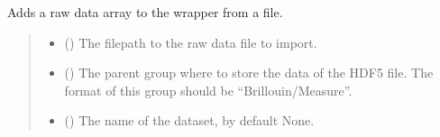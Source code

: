 \documentclass[letterpaper,10pt,english]{sphinxmanual}
\begin{document}
\begin{fulllineitems}
\begin{fulllineitems}
\begin{quote}
\begin{description}
\end{description}\end{quote}

\end{fulllineitems}


\begin{fulllineitems}
\label{\detokenize{source/_autosummary/HDF5_BLS.Wrapper:HDF5_BLS.Wrapper.import_other}}
\pysigstartsignatures
\pysiglinewithargsret
{}
{\sphinxparamcomma {}\sphinxparamcomma {}\sphinxparamcomma {}\sphinxparamcomma {}\sphinxparamcomma {}\sphinxparamcomma {}}
{}
\pysigstopsignatures
\sphinxAtStartPar
Adds a raw data array to the wrapper from a file.
\begin{quote}\begin{description}
\begin{itemize}
\item {} 
\sphinxAtStartPar
{} () \textendash{} The filepath to the raw data file to import.

\item {} 
\sphinxAtStartPar
{} (\sphinxstyleliteralemphasis{\sphinxupquote{, }}) \textendash{} The parent group where to store the data of the HDF5 file. The format of this group should be “Brillouin/Measure”.

\item {} 
\sphinxAtStartPar
{} (\sphinxstyleliteralemphasis{\sphinxupquote{, }}) \textendash{} The name of the dataset, by default None.


\end{itemize}
\end{description}
\end{quote}
\end{fulllineitems}
\end{fulllineitems}
\end{document}
